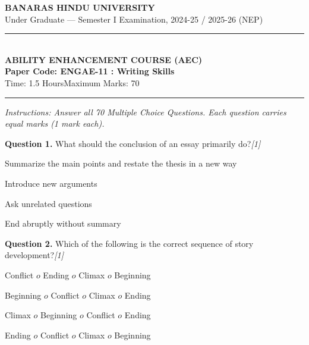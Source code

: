 \documentclass[11pt,a4paper]{article}
\newcommand{\pts}[1]{\hfill   \textit{[#1]}}
\begin{document}
\begin{center}
  {\large\bfseries BANARAS HINDU UNIVERSITY}\\[2pt]
  {\normalsize Under Graduate --- Semester I Examination, 2024-25 / 2025-26 (NEP)}\\[6pt]
  \rule{0.8\linewidth}{0.5pt}\\[6pt]
  {\large\bfseries ABILITY ENHANCEMENT COURSE (AEC)}\\[4pt]
  {\large\bfseries Paper Code: ENGAE-11 : Writing Skills}\\[4pt]
  {\normalsize Time: 1.5 Hours\hfill Maximum Marks: 70}
\end{center}

\rule{\linewidth}{0.4pt}

\smallskip



\noindent   \textit{Instructions: Answer all 70 Multiple Choice Questions. Each question carries equal marks (1 mark each).}

\bigskip




\noindent   \textbf{Question 1.} What should the conclusion of an essay primarily do?\pts{1}

\begin{parts}
  \item Summarize the main points and restate the thesis in a new way
  \item Introduce new arguments
  \item Ask unrelated questions
  \item End abruptly without summary
\end{parts}

\medskip




\noindent   \textbf{Question 2.} Which of the following is the correct sequence of story development?\pts{1}

\begin{parts}
  \item Conflict $ o$ Ending $ o$ Climax $ o$ Beginning
  \item Beginning $ o$ Conflict $ o$ Climax $ o$ Ending
  \item Climax $ o$ Beginning $ o$ Conflict $ o$ Ending
  \item Ending $ o$ Conflict $ o$ Climax $ o$ Beginning
\end{parts}

\medskip
\end{document}
